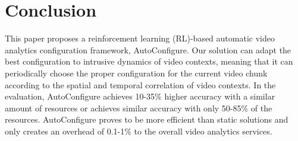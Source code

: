 \section{Conclusion}
\label{Section: conclusion}

This paper proposes a reinforcement learning (RL)-based automatic video analytics configuration framework, AutoConfigure. Our solution can adapt the best configuration to intrusive dynamics of video contexts, meaning that it can periodically choose the proper configuration for the current video chunk according to the spatial and temporal correlation of video contexts. In the evaluation, AutoConfigure achieves 10-35\% higher accuracy with a similar amount of resources or achieves similar accuracy with only 50-85\% of the resources. AutoConfigure proves to be more efficient than static solutions and only creates an overhead of 0.1-1\% to the overall video analytics services.